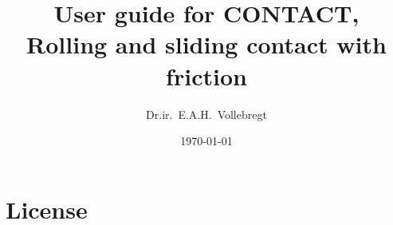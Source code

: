 \documentclass[12pt]{report}
\title{User guide for CONTACT,\\
       Rolling and sliding contact with friction}
\author{Dr.ir.\ E.A.H.\ Vollebregt}
\date{\today}
\renewcommand{\magenta}[1]{}
\begin{document}
\pagestyle{vtrep}
\maketitle


\magenta{
\begin{vtlogsheet}
\vtlogentry{1.140}{EV}{15-12-2022}{Version for release v22.2}{}
\vtlogentry{1.145}{EV}{14-04-2023}{Version for release v23.1}{}
\vtlogentry{1.146}{EV}{10-05-2023}{Added massless rail deflection ${\tt 
        F}_1=3$}{}
\vtlogentry{1.147}{EV}{19-06-2023}{Changed cntc\_getprofilevalues}{}
\vtlogentry{1.148}{EV}{31-07-2023}{Added configuration of debug outputs}{}
\vtlogentry{1.149}{EV}{11-08-2023}{Added ${\tt D}=7$ using initial contact
        position}{}
\vtlogentry{1.150}{EV}{16-08-2023}{Added comment on slice feature positions}{}
\vtlogentry{1.151}{EV}{23-08-2023}{Clear out-file upon new initialization}{}
\vtlogentry{1.152}{EV}{12-09-2023}{Delete arc-fit, add conversion formulas}{}
\vtlogentry{1.153}{EV}{04-10-2023}{Added wheel slices file}{}
\vtlogentry{1.154}{EV}{24-10-2023}{Add description of {\tt
        cntc\_getcpresults}}{}
\vtlogentry{1.155}{EV}{03-11-2023}{Version for release v23.2}{}
\vtlogentry{1.156}{EV}{10-11-2023}{Added wheel flat example}{}
\vtlogentry{1.157}{EV}{21-11-2023}{Added super grid with active window}{}
\vtlogentry{1.158}{EV}{28-11-2023}{Permit {\tt I}-digit in module 1}{}
\vtlogentry{1.159}{EV}{30-11-2023}{Extension of Cattaneo solution for
        radius $a$}{}
\vtlogentry{1.160}{EV}{01-12-2023}{Added spin center}{}
\vtlogentry{1.161}{EV}{11-12-2023}{Permit ${\tt T}=1,2$ in module 1}{}
\vtfilelocation{$<$svn-contc$>$/contact/doc}
\end{vtlogsheet}
}


\tableofcontents

\clearpage
\chapter*{License}
\end{document}
